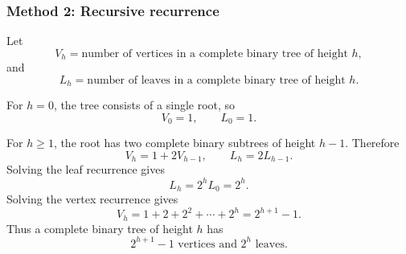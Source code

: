 \documentclass[12pt]{article}
\begin{document}
\subsubsection{Method 2: Recursive recurrence}
Let
\[
  V_h=\text{number of vertices in a complete binary tree of height }h,
\]
and
\[
  L_h=\text{number of leaves in a complete binary tree of height }h.
\]

For $h=0$, the tree consists of a single root, so
\[
  V_0=1,
  \qquad
  L_0=1.
\]

For $h\ge 1$, the root has two complete binary subtrees of height $h-1$. Therefore
\[
  V_h=1+2V_{h-1},
  \qquad
  L_h=2L_{h-1}.
\]
Solving the leaf recurrence gives
\[
  L_h=2^hL_0=2^h.
\]
Solving the vertex recurrence gives
\[
  V_h=1+2+2^2+\cdots+2^h=2^{h+1}-1.
\]
Thus a complete binary tree of height $h$ has
\[
  \boxed{2^{h+1}-1\text{ vertices and }2^h\text{ leaves}.}
\]
\end{document}
